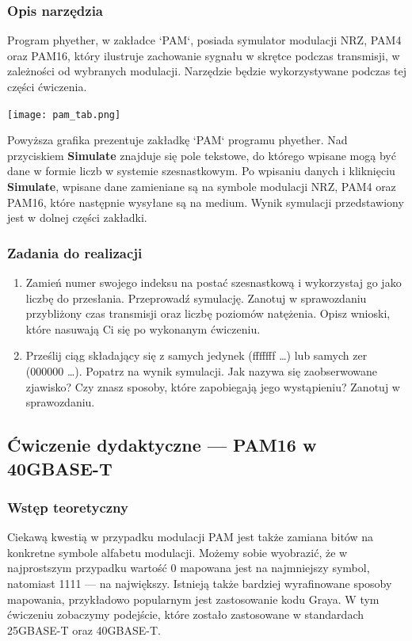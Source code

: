 \subsubsection{Opis narzędzia}

Program phyether, w zakładce `PAM`, posiada symulator modulacji NRZ, PAM4 oraz PAM16, który ilustruje zachowanie sygnału w skrętce podczas transmisji, w zależności
od wybranych modulacji.
Narzędzie będzie wykorzystywane podczas tej części ćwiczenia.

\texttt{[image: pam\_tab.png]}

Powyższa grafika prezentuje zakładkę `PAM` programu phyether. Nad przyciskiem \textbf{Simulate} znajduje się pole tekstowe, do którego wpisane mogą być dane w formie
liczb w systemie szesnastkowym. Po wpisaniu danych i kliknięciu \textbf{Simulate}, wpisane dane zamieniane są na symbole modulacji NRZ, PAM4 oraz PAM16, które
następnie wysyłane są na medium. Wynik symulacji przedstawiony jest w dolnej części zakładki.

\subsubsection{Zadania do realizacji}

\begin{enumerate}
    \item Zamień numer swojego indeksu na postać szesnastkową i wykorzystaj go jako liczbę do przesłania. Przeprowadź symulację. Zanotuj w sprawozdaniu
    przybliżony czas transmisji oraz liczbę poziomów natężenia. Opisz wnioski, które nasuwają Ci się po wykonanym ćwiczeniu.
    \item Prześlij ciąg składający się z samych jedynek (fffffff \dots) lub samych zer (000000 \dots). Popatrz na wynik symulacji. Jak nazywa się zaobserwowane zjawisko? Czy znasz sposoby,
    które zapobiegają jego wystąpieniu? Zanotuj w sprawozdaniu.
\end{enumerate}

\subsection{Ćwiczenie dydaktyczne --- PAM16 w 40GBASE-T}
\subsubsection{Wstęp teoretyczny}
Ciekawą kwestią w przypadku modulacji PAM jest także zamiana bitów na konkretne symbole alfabetu modulacji.
Możemy sobie wyobrazić, że w najprostszym przypadku wartość 0 mapowana jest na najmniejszy symbol, natomiast 1111
--- na największy. Istnieją także bardziej wyrafinowane sposoby mapowania, przykładowo popularnym jest zastosowanie kodu Graya.
W tym ćwiczeniu zobaczymy podejście, które zostało zastosowane w standardach 25GBASE-T oraz 40GBASE-T.

